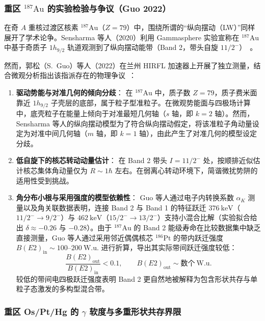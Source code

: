 \subsubsection{重区 $^{187}\mathrm{Au}$ 的实验检验与争议（Guo 2022）}

在奇 $A$ 重核过渡区核素 $^{187}\mathrm{Au}$（$Z=79$）中，围绕所谓的“纵向摆动（LW）”同样展开了学术论争。Sensharma 等人（2020）利用 Gammasphere 实验宣称在 $^{187}\mathrm{Au}$ 中基于奇质子 $1h_{9/2}$ 轨道观测到了纵向摆动能带（Band 2，带头自旋 $11/2^-$）~\cite{sensharma-2020-longitudinal-wobbling-187au}。

然而，郭松（S.~Guo）等人（2022）在兰州 HIRFL 加速器上开展了独立测量，结合微观分析指出该指派存在的物理争议~\cite{guo-2022-low-spin-wobbling-187au}：
\begin{enumerate}
\item \textbf{驱动势能与对准几何的倾向分歧}：
在 $^{187}\mathrm{Au}$ 中，质子数 $Z=79$，质子费米面靠近 $1h_{9/2}$ 子壳层的底部，属于粒子型准粒子。在微观势能面与四极场计算中，底壳粒子在能量上倾向于对准最短几何轴（$s$ 轴，即 $k=2$ 轴）。然而，Sensharma 等人的纵向摆动模型为了符合纵向摆动假定，将该准粒子角动量设定为对准中间几何轴（$m$ 轴，即 $k=1$ 轴），由此产生了对准几何的模型设定分歧。
\item \textbf{低自旋下的核芯转动动量估计}：
在 Band 2 带头 $I = 11/2^-$ 处，按顺排近似估计核芯集体角动量仅为 $R \sim 1\hbar$ 左右。在弱离心转动环境下，简谐微扰势阱的适用性受到挑战。
\item \textbf{角分布小根与采用强度的模型依赖性}：
Guo 等人通过电子内转换系数 $\alpha_K$ 测量以及角关联数据表明，连接 Band 2 与 Band 1 的特征跃迁 $376\ \mathrm{keV}$（$11/2^- \to 9/2^-$）与 $462\ \mathrm{keV}$（$15/2^- \to 13/2^-$）支持小混合比解（实验拟合给出 $\delta \approx -0.26$ 与 $-0.28$）。由于 $^{187}\mathrm{Au}$ 的 Band 2 能级寿命在比较数据集中缺乏直接测量，Guo 等人通过采用邻近偶偶核芯 $^{186}\mathrm{Pt}$ 的带内跃迁强度 $B(E2)_{\mathrm{in}} \sim 100$--$200\ \mathrm{W.u.}$ 进行折算，导出其实际带间跃迁强度较低：
\begin{equation}\label{eq:4-4-au187-be2-ratio}
\frac{B(E2)_{\mathrm{out}}}{B(E2)_{\mathrm{in}}} < 0.1, \qquad B(E2)_{\mathrm{out}} \sim \text{数个}\ \mathrm{W.u.}
\end{equation}
较低的带间电四极跃迁强度表明 Band 2 更自然地被解释为包含形状共存与单粒子态激发的多构型混合带。
\end{enumerate}

\subsubsection{重区 Os/Pt/Hg 的 $\gamma$ 软度与多重形状共存界限}

